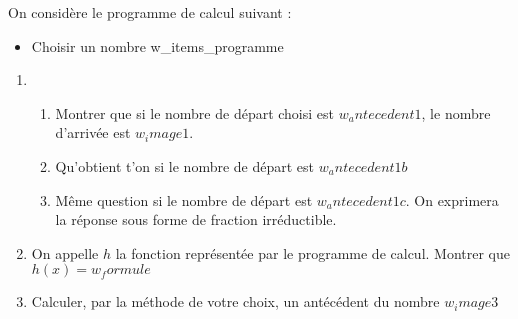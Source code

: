 \begin{exo}
    On considère le programme de calcul suivant : 
    \begin{itemize}
        \item Choisir un nombre
        {w_items_programme}
    \end{itemize}

    \begin{enumerate}
        \item \begin{enumerate} 
            \item Montrer que si le nombre de départ choisi est ${w_antecedent1}$, le nombre d'arrivée est ${w_image1}$.
            \item Qu'obtient t'on si le nombre de départ est ${w_antecedent1b}$
            \item Même question si le nombre de départ est ${w_antecedent1c}$. On exprimera la réponse sous forme de fraction irréductible.
        \end{enumerate}
        \item On appelle $h$ la fonction représentée par le programme de calcul. Montrer que $h(x)={w_formule}$
        \item Calculer, par la méthode de votre choix, un antécédent du nombre ${w_image3}$
    \end{enumerate}

\end{exo}
\vspace{0.5cm}
